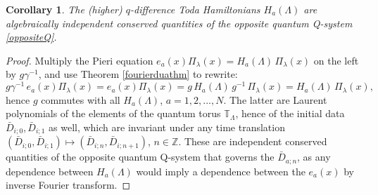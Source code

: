 \documentclass[12pt]{amsart}
\newtheorem{cor}[thm]{Corollary}
\newcommand{\Z}{{\mathbb Z}}
\newcommand{\lL}{{\Lambda}}
\numberwithin{equation}{section}
\begin{document}
\begin{cor}\label{identiftoda}
The (higher) $q$-difference Toda Hamiltonians $H_a(\lL)$ are algebraically independent conserved quantities of the 
opposite quantum Q-system \eqref{oppositeQ}.
\end{cor}
\begin{proof}
Multiply the Pieri equation $e_a(x)\Pi_\lambda(x)=H_a(\lL)\,\Pi_\lambda(x)$ on the left by $g \gamma^{-1}$, and use
Theorem \ref{fourierduathm} to rewrite:
$$g\gamma^{-1} \,e_a(x)\Pi_\lambda(x)=e_a(x)\Pi_\lambda(x)=g\,H_a(\lL)\,g^{-1}\, \Pi_\lambda(x)=H_a(\lL)\, \Pi_\lambda(x),$$
hence $g$ commutes with all $H_a(\lL)$, $a=1,2,...,N$. The latter are Laurent polynomials of the elements of the quantum torus 
$\mathbb T_\lL$, hence of the initial data $\bar D_{i;0},\bar D_{i;1}$ as well, which are invariant under any time translation
$(\bar D_{i;0},\bar D_{i;1})\mapsto (\bar D_{i;n},\bar D_{i;n+1})$, $n\in \Z$. These are independent conserved quantities 
of the opposite quantum Q-system that governs the $\bar D_{a;n}$, as any dependence between $H_a(\lL)$ would imply 
a dependence between the $e_a(x)$ by inverse Fourier transform.
\end{proof}
\end{document}
